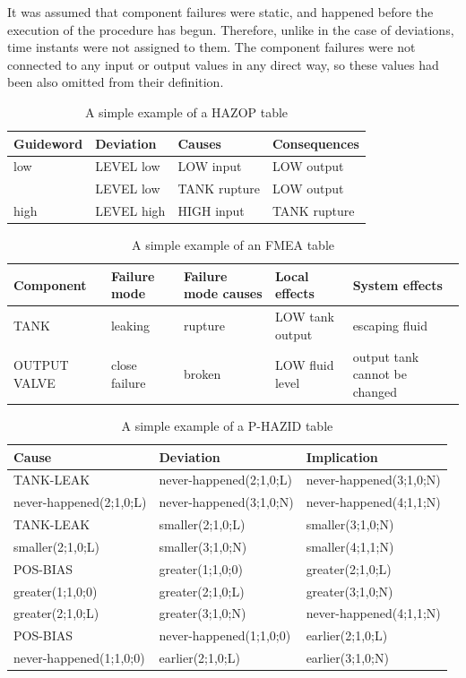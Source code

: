 \documentclass[conference]{IEEEtran}
\begin{document}
It was assumed that component failures were static, and happened before the execution of the procedure has begun. Therefore, unlike in the case of deviations, time instants were not assigned to them. The component failures were not connected to any input or output values in any direct way, so these values had been also omitted from their definition. 

\begin{table}
\centering
\begin{tabular}{|l|l|l|l|}
\hline
Guideword & Deviation & Causes & Consequences \\
\hline
\hline
low & LEVEL low & LOW input & LOW output \\
& LEVEL low & TANK rupture & LOW output \\
\hline
high & LEVEL high & HIGH input & TANK rupture \\
\hline
\end{tabular}
\caption{A simple example of a HAZOP table}
\label{tab:ehazop}
\end{table}

\begin{table}
\centering
\begin{tabular}{|l|l|l|l|l|}
\hline
Component & Failure mode & Failure mode causes & Local effects & System effects \\
\hline
\hline
TANK & leaking & rupture & LOW tank output & escaping fluid \\
\hline
OUTPUT VALVE & close failure & broken & LOW fluid level & output tank cannot be changed \\
\hline
\end{tabular}
\caption{A simple example of an FMEA table}
\label{tab:efmea}
\end{table}

\begin{table}
\centering
\begin{tabular}{|l|l|l|}
\hline
Cause & Deviation & Implication \\
\hline
\hline
TANK-LEAK & never-happened(2;1,0;L) & never-happened(3;1,0;N) \\
\hline
never-happened(2;1,0;L) & never-happened(3;1,0;N) & never-happened(4;1,1;N) \\
\hline
TANK-LEAK & smaller(2;1,0;L) & smaller(3;1,0;N) \\
\hline
smaller(2;1,0;L) & smaller(3;1,0;N) & smaller(4;1,1;N) \\
\hline
POS-BIAS & greater(1;1,0;0) & greater(2;1,0;L) \\
\hline
greater(1;1,0;0) & greater(2;1,0;L) & greater(3;1,0;N) \\
\hline
greater(2;1,0;L) & greater(3;1,0;N) & never-happened(4;1,1;N) \\
\hline
POS-BIAS& never-happened(1;1,0;0) & earlier(2;1,0;L) \\
\hline
never-happened(1;1,0;0) & earlier(2;1,0;L) & earlier(3;1,0;N) \\
\hline
\end{tabular}
\caption{A simple example of a P-HAZID table}
\label{tab:eprochazid}
\end{table}
\end{document}

